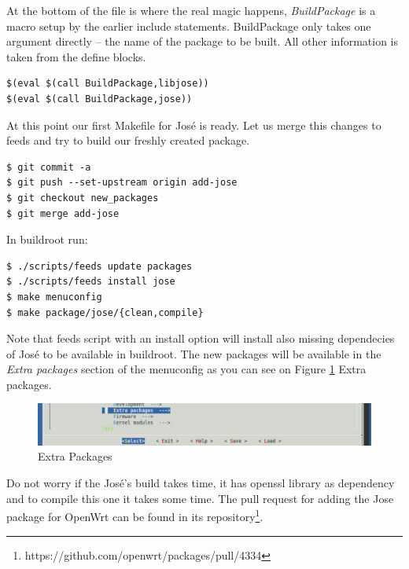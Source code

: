 At the bottom of the file is where the real magic happens, {\it BuildPackage} is a macro setup by the earlier include statements.
BuildPackage only takes one argument directly – the name of the package to be built.
All other information is taken from the define blocks.
\begin{lstlisting}[columns=fixed,basicstyle=\ttfamily\footnotesize,tabsize=4,backgroundcolor=\color{yellow!10}]
$(eval $(call BuildPackage,libjose))
$(eval $(call BuildPackage,jose))
\end{lstlisting}
At this point our first Makefile for José is ready.
Let us merge this changes to feeds and try to build our freshly created package.
\begin{lstlisting}[columns=fixed,basicstyle=\ttfamily\footnotesize,tabsize=4,backgroundcolor=\color{yellow!10}]
$ git commit -a
$ git push --set-upstream origin add-jose
$ git checkout new_packages
$ git merge add-jose
\end{lstlisting}
In buildroot run:
\begin{lstlisting}[columns=fixed,basicstyle=\ttfamily\footnotesize,tabsize=4,backgroundcolor=\color{yellow!10}]
$ ./scripts/feeds update packages
$ ./scripts/feeds install jose
$ make menuconfig
$ make package/jose/{clean,compile}
\end{lstlisting}
Note that feeds script with an install option will install also missing dependecies of José to be available in buildroot.
The new packages will be available in the {\it Extra packages} section of the menuconfig as you can see on Figure \ref{fig_extra} Extra packages.
\begin{figure}[h]
    \centering
    \includegraphics[scale=0.6]{figures/extra_packages.pdf}
    \caption{Extra Packages}
    \label{fig_extra}
\end{figure}
Do not worry if the José's build takes time, it has openssl library as dependency and to compile this one it takes some time.
The pull request for adding the Jose package for OpenWrt can be found in its repository\footnote{https://github.com/openwrt/packages/pull/4334}.
